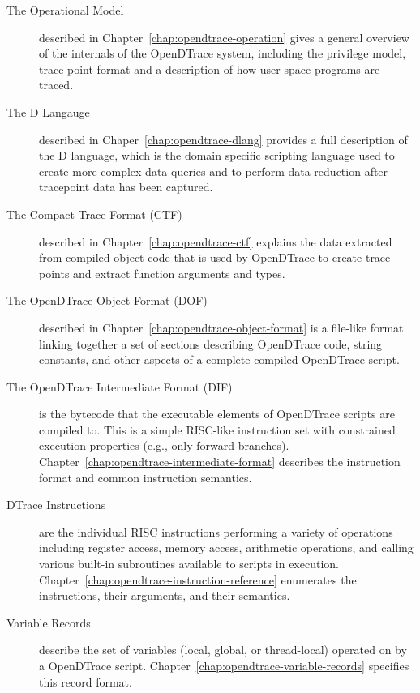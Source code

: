 \begin{description}

\item[The Operational Model] described in
  Chapter~\ref{chap:opendtrace-operation} gives a general overview of
  the internals of the OpenDTrace system, including the privilege
  model, trace-point format and a description of how user space
  programs are traced.

\item[The D Langauge] described in
  Chaper~\ref{chap:opendtrace-dlang} provides a full description of
  the D language, which is the domain specific scripting language used
  to create more complex data queries and to perform data reduction
  after tracepoint data has been captured.

\item[The Compact Trace Format (CTF)] described in
  Chapter~\ref{chap:opendtrace-ctf} explains the data extracted from
  compiled object code that is used by OpenDTrace to create trace
  points and extract function arguments and types.

\item[The OpenDTrace Object Format (DOF)] described in
  Chapter~\ref{chap:opendtrace-object-format} is a file-like format linking
  together a set of sections describing OpenDTrace code, string constants, and
  other aspects of a complete compiled OpenDTrace script.

\item[The OpenDTrace Intermediate Format (DIF)] is the bytecode that the
  executable elements of OpenDTrace scripts are compiled to.
  This is a simple RISC-like instruction set with constrained execution
  properties (e.g., only forward branches).
  Chapter~\ref{chap:opendtrace-intermediate-format} describes the instruction
  format and common instruction semantics.

\item[DTrace Instructions] are the individual RISC instructions
  performing a variety of operations including register access, memory
  access, arithmetic operations, and calling various built-in
  subroutines available to scripts in execution.
  Chapter~\ref{chap:opendtrace-instruction-reference} enumerates the
  instructions, their arguments, and their semantics.

\item[Variable Records] describe the set of variables (local, global,
  or thread-local) operated on by a OpenDTrace script.
  Chapter~\ref{chap:opendtrace-variable-records} specifies this record format.


\end{description}
